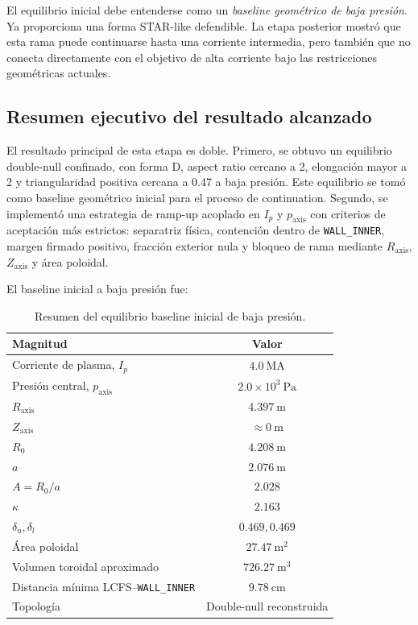 \documentclass[11pt,a4paper]{article}
\begin{document}
El equilibrio inicial debe entenderse como un \emph{baseline geométrico de baja presión}. Ya
proporciona una forma STAR-like defendible. La etapa posterior mostró que esta rama puede
continuarse hasta una corriente intermedia, pero también que no conecta directamente con el
objetivo de alta corriente bajo las restricciones geométricas actuales.

\subsection{Resumen ejecutivo del resultado alcanzado}
El resultado principal de esta etapa es doble. Primero, se obtuvo un equilibrio double-null
confinado, con forma D, aspect ratio cercano a 2, elongación mayor a 2 y triangularidad positiva
cercana a 0.47 a baja presión. Este equilibrio se tomó como baseline geométrico inicial para
el proceso de continuation. Segundo, se implementó una estrategia de ramp-up acoplado en
$I_p$ y $p_{\mathrm{axis}}$ con criterios de aceptación más estrictos: separatriz física,
contención dentro de \texttt{WALL\_INNER}, margen firmado positivo, fracción exterior nula
y bloqueo de rama mediante $R_{\mathrm{axis}}$, $Z_{\mathrm{axis}}$ y área poloidal.

El baseline inicial a baja presión fue:

\begin{table}[htbp]
\centering
\caption{Resumen del equilibrio baseline inicial de baja presión.}
\label{tab:baseline_summary_exec}
\begin{tabular}{lc}
\toprule
\textbf{Magnitud} & \textbf{Valor} \\
\midrule
Corriente de plasma, $I_p$ & $4.0~\mathrm{MA}$ \\
Presión central, $p_{\mathrm{axis}}$ & $2.0\times 10^3~\mathrm{Pa}$ \\
$R_{\mathrm{axis}}$ & $4.397~\mathrm{m}$ \\
$Z_{\mathrm{axis}}$ & $\approx 0~\mathrm{m}$ \\
$R_0$ & $4.208~\mathrm{m}$ \\
$a$ & $2.076~\mathrm{m}$ \\
$A=R_0/a$ & $2.028$ \\
$\kappa$ & $2.163$ \\
$\delta_u,\delta_l$ & $0.469,0.469$ \\
Área poloidal & $27.47~\mathrm{m^2}$ \\
Volumen toroidal aproximado & $726.27~\mathrm{m^3}$ \\
Distancia mínima LCFS--\texttt{WALL\_INNER} & $9.78~\mathrm{cm}$ \\
Topología & Double-null reconstruida \\
\bottomrule
\end{tabular}
\end{table}
\end{document}
